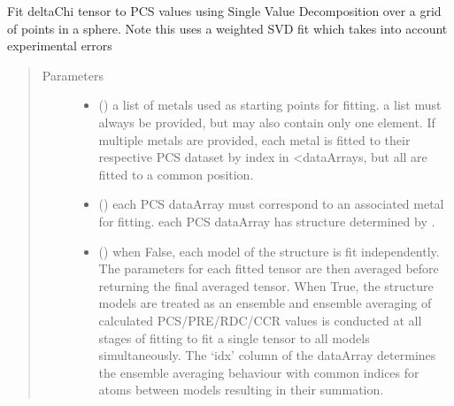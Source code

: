 \documentclass[a4paper,10pt,english,openany,oneside]{sphinxmanual}
\begin{document}
\begin{fulllineitems}
\label{\detokenize{reference/generated/paramagpy.fit.svd_gridsearch_fit_metal_from_pcs:paramagpy.fit.svd_gridsearch_fit_metal_from_pcs}}
Fit deltaChi tensor to PCS values using Single Value Decomposition over
a grid of points in a sphere.
Note this uses a weighted SVD fit which takes into account
experimental errors
\begin{quote}\begin{description}
\item[{Parameters}] \leavevmode\begin{itemize}
\item {} 
 () \textendash{} a list of metals used as starting points for fitting.
a list must always be provided, but may also contain
only one element. If multiple metals are provided, each metal
is fitted to their respective PCS dataset by index in \textless{}dataArrays,
but all are fitted to a common position.

\item {} 
 () \textendash{} each PCS dataArray must correspond to an associated metal for fitting.
each PCS dataArray has structure determined by
{\hyperref[\detokenize{reference/generated/paramagpy.protein.CustomStructure.parse:paramagpy.protein.CustomStructure.parse}]{}}.

\item {} 
 (\sphinxstyleliteralemphasis{\sphinxupquote{, }}) \textendash{} when False, each model of the structure is fit independently.
The parameters for each fitted tensor are then averaged before
returning the final averaged tensor.
When True, the structure models are treated as an ensemble and
ensemble averaging of calculated PCS/PRE/RDC/CCR values is
conducted at all stages of fitting to fit a single tensor to all
models simultaneously. The ‘idx’ column of the dataArray
determines the ensemble averaging behaviour with common indices
for atoms between models resulting in their summation.


\end{itemize}
\end{description}
\end{quote}
\end{fulllineitems}
\end{document}
